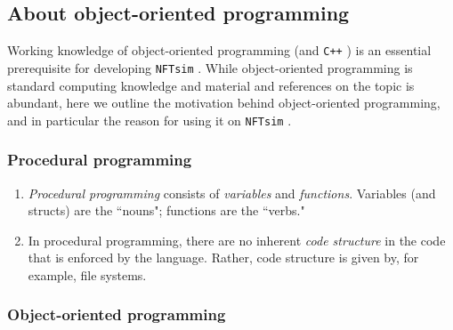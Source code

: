 \documentclass[12pt,a4paper]{article}
\newcommand{\type}[1]{{\small\small\tt #1} }
\newcommand{\NF}[0]{\type{NFTsim}}
\begin{document}


\subsection{About object-oriented programming}

Working knowledge of object-oriented programming (and \type{C++}) is an essential prerequisite for developing \NF. While object-oriented programming is standard computing knowledge and material and references on the topic is abundant, here we outline the motivation behind object-oriented programming, and in particular the reason for using it on \NF.

\subsubsection{Procedural programming}

\begin{enumerate}

\item \emph{Procedural programming} consists of \emph{variables} and \emph{functions}. Variables (and structs) are the ``nouns"; functions are the ``verbs."

\item In procedural programming, there are no inherent \emph{code structure} in the code that is enforced by the language. Rather, code structure is given by, for example, file systems.
\end{enumerate}

\subsubsection{Object-oriented programming}
\end{document}
